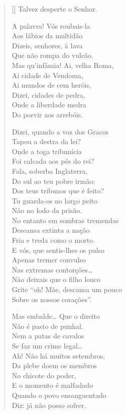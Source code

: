 \documentclass[12pt]{book}
\begin{document}
\begin{verse}[\versewidth]
					Talvez desperte o Senhor. 
					
					A palavra! Vós roubais-la \\
					Aos lábios da multidão \\
					Dizeis, senhores, à lava \\
					Que não rompa do vulcão.\\
					Mas qu’infâmia! Ai, velha Roma, \\
					Ai cidade de Vendoma, \\
					Ai mundos de cem heróis,\\
					Dizei, cidades de pedra,\\
					Onde a liberdade medra\\
					Do porvir aos arrebóis.
					
					Dizei, quando a voz dos Gracos \\
					Tapou a destra da lei? \\
					Onde a toga tribunícia \\
					Foi calcada aos pés do rei? \\
					Fala, soberba Inglaterra, \\
					Do sul ao teu pobre irmão; \\
					Dos teus tribunos que é feito? \\
					Tu guarda-os no largo peito \\
					Não no lodo da prisão. \\
					No entanto em sombras tremendas\\
					Descansa extinta a nação \\
					Fria e treda como o morto. \\
					E vós, que sentis-lhes os pulso \\
					Apenas tremer convulso \\
					Nas extremas contorções… \\
					Não deixais que o filho louco \\
					Grite “oh! Mãe, descansa um pouco \\
					Sobre os nossos corações”. 
						
					Mas embalde… Que o direito \\
					Não é pasto de punhal. \\
					Nem a patas de cavalos \\
					Se faz um crime legal… \\
					Ah! Não há muitos setembros, \\
					Da plebe doem os membros \\
					No chicote do poder, \\
					E o momento é malfadado \\ 
					Quando o povo ensanguentado \\
					Diz: já não posso sofrer.
					

\end{verse}
\end{document}
